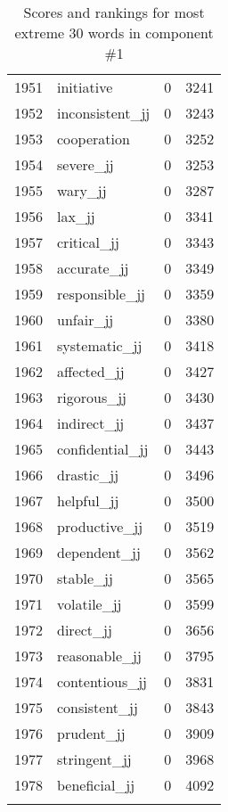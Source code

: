 \begin{longtable}[!htbp]{| rlr@{.}l |}
    1951 & initiative & 0 & 3241 \\
    1952 & inconsistent\_jj & 0 & 3243 \\
    1953 & cooperation & 0 & 3252 \\
    1954 & severe\_jj & 0 & 3253 \\
    1955 & wary\_jj & 0 & 3287 \\
    1956 & lax\_jj & 0 & 3341 \\
    1957 & critical\_jj & 0 & 3343 \\
    1958 & accurate\_jj & 0 & 3349 \\
    1959 & responsible\_jj & 0 & 3359 \\
    1960 & unfair\_jj & 0 & 3380 \\
    1961 & systematic\_jj & 0 & 3418 \\
    1962 & affected\_jj & 0 & 3427 \\
    1963 & rigorous\_jj & 0 & 3430 \\
    1964 & indirect\_jj & 0 & 3437 \\
    1965 & confidential\_jj & 0 & 3443 \\
    1966 & drastic\_jj & 0 & 3496 \\
    1967 & helpful\_jj & 0 & 3500 \\
    1968 & productive\_jj & 0 & 3519 \\
    1969 & dependent\_jj & 0 & 3562 \\
    1970 & stable\_jj & 0 & 3565 \\
    1971 & volatile\_jj & 0 & 3599 \\
    1972 & direct\_jj & 0 & 3656 \\
    1973 & reasonable\_jj & 0 & 3795 \\
    1974 & contentious\_jj & 0 & 3831 \\
    1975 & consistent\_jj & 0 & 3843 \\
    1976 & prudent\_jj & 0 & 3909 \\
    1977 & stringent\_jj & 0 & 3968 \\
    1978 & beneficial\_jj & 0 & 4092 \\
    \hline
    \caption{Scores and rankings for most extreme 30 words in component \#1} \\
\end{longtable}
